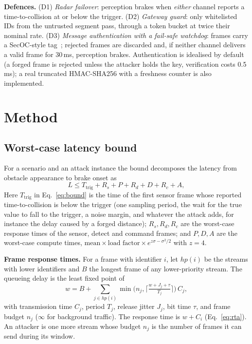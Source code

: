 \documentclass[conference]{IEEEtran}
\begin{document}
\textbf{Defences.} (D1) \emph{Radar failover}: perception brakes when \emph{either} channel reports a time-to-collision at or below the trigger. (D2) \emph{Gateway guard}: only whitelisted IDs from the untrusted segment pass, through a token bucket at twice their nominal rate. (D3) \emph{Message authentication with a fail-safe watchdog}: frames carry a SecOC-style tag~\cite{secoc}; rejected frames are discarded and, if neither channel delivers a valid frame for 30\,ms, perception brakes. Authentication is idealised by default (a forged frame is rejected unless the attacker holds the key, verification costs 0.5\,ms); a real truncated HMAC-SHA256 with a freshness counter is also implemented.

\section{Method}
\subsection{Worst-case latency bound}
For a scenario and an attack instance the bound decomposes the latency from obstacle appearance to brake onset as
\begin{equation}
L \le T_{\text{trig}} + R_s + P + R_d + D + R_c + A,
\label{eq:bound}
\end{equation}
Here $T_{\text{trig}}$ in Eq.~\eqref{eq:bound} is the time of the first sensor frame whose reported time-to-collision is below the trigger (one sampling period, the wait for the true value to fall to the trigger, a noise margin, and whatever the attack adds, for instance the delay caused by a forged distance); $R_s,R_d,R_c$ are the worst-case response times of the sensor, detect and command frames; and $P,D,A$ are the worst-case compute times, $\text{mean}\times\text{load factor}\times e^{z\sigma-\sigma^2/2}$ with $z=4$.

\textbf{Frame response times.} For a frame with identifier $i$, let $hp(i)$ be the streams with lower identifiers and $B$ the longest frame of any lower-priority stream. The queueing delay is the least fixed point of
\begin{equation}
w = B + \sum_{j\in hp(i)} \min\!\Big(n_j,\Big\lceil \tfrac{w+J_j+\tau}{T_j}\Big\rceil\Big)\,C_j,
\label{eq:rta}
\end{equation}
with transmission time $C_j$, period $T_j$, release jitter $J_j$, bit time $\tau$, and frame budget $n_j$ ($\infty$ for background traffic). The response time is $w+C_i$ (Eq.~\eqref{eq:rta}). An attacker is one more stream whose budget $n_j$ is the number of frames it can send during its window.
\end{document}
